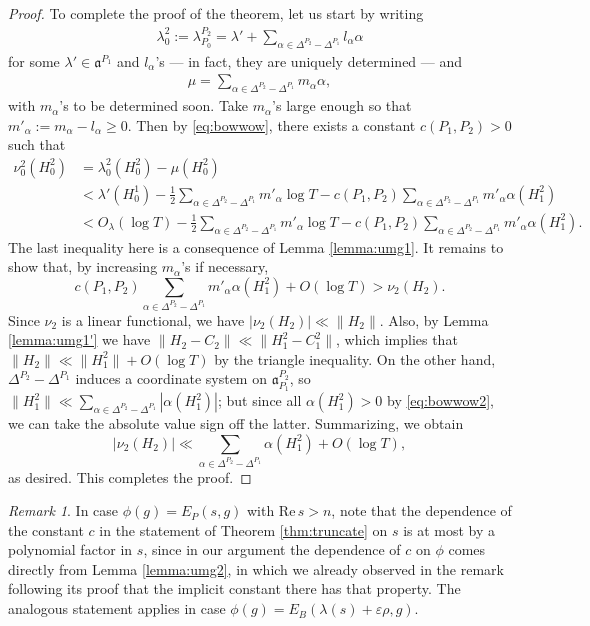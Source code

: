 \documentclass[11pt]{amsart}
\numberwithin{theorem}{section}
\numberwithin{equation}{section}
\theoremstyle{remark}
\newtheorem*{remark}{Remark}
\theoremstyle{definition}
\newcommand{\re}{\mathrm{Re}\,}
\newcommand{\ga}{\mathfrak{a}}
\begin{document}
\begin{proof}
To complete the proof of the theorem, let us start by writing
\begin{align*}
\lambda_0^2 := \lambda_{P_0}^{P_2} = \lambda' + \sum_{\alpha \in \Delta^{P_2} - \Delta^{P_1}} l_\alpha \alpha
\end{align*}
for some $\lambda' \in \ga^{P_1}$ and $l_\alpha$'s --- in fact, they are uniquely determined --- and
\begin{align*}
\mu = \sum_{\alpha \in \Delta^{P_2}-\Delta^{P_1}} m_\alpha \alpha,
\end{align*}
with $m_\alpha$'s to be determined soon. Take $m_\alpha$'s large enough so that $m'_\alpha := m_\alpha - l_\alpha \geq 0$.
Then by \eqref{eq:bowwow}, there exists a constant $c(P_1,P_2)>0$ such that
\begin{align*}
\nu_0^2(H_0^2) &= \lambda_0^2(H_0^2) - \mu(H_0^2) \\
&< \lambda'(H_0^1) -\frac{1}{2}\sum_{\alpha \in \Delta^{P_2} - \Delta^{P_1}} m'_\alpha\log T - c(P_1,P_2)\sum_{\alpha \in \Delta^{P_2} - \Delta^{P_1}} m'_\alpha\alpha(H_1^2) \\
&< O_\lambda(\log T) -\frac{1}{2}\sum_{\alpha \in \Delta^{P_2} - \Delta^{P_1}} m'_\alpha\log T - c(P_1,P_2)\sum_{\alpha \in \Delta^{P_2} - \Delta^{P_1}} m'_\alpha\alpha(H_1^2).
\end{align*}
The last inequality here is a consequence of Lemma \ref{lemma:umg1}.
It remains to show that, by increasing $m_\alpha$'s if necessary, 
\begin{equation*}
c(P_1,P_2)\sum_{\alpha \in \Delta^{P_2} - \Delta^{P_1}} m'_\alpha\alpha(H_1^2) + O(\log T) > \nu_2(H_2).
\end{equation*}
Since $\nu_2$ is a linear functional, we have $|\nu_2(H_2)| \ll \|H_2\|$. Also, by Lemma \ref{lemma:umg1'} we have $\|H_2-C_2\| \ll \|H_1^2-C_1^2\|$, which implies that $\|H_2\| \ll \|H_1^2\|+O(\log T)$ by the triangle inequality.
On the other hand, $\Delta^{P_2} - \Delta^{P_1}$ induces a coordinate system on $\ga_{P_1}^{P_2}$, so $\|H_1^2\| \ll \sum_{\alpha \in \Delta^{P_2} - \Delta^{P_1}} |\alpha(H_1^2)|$; but since all $\alpha(H_1^2) > 0$ by \eqref{eq:bowwow2}, we can take the absolute value sign off the latter. Summarizing, we obtain
\begin{equation*}
|\nu_2(H_2)| \ll \sum_{\alpha \in \Delta^{P_2} - \Delta^{P_1}} \alpha(H_1^2) + O(\log T),
\end{equation*}
as desired.
This completes the proof.
\end{proof}

\begin{remark}
In case $\phi(g) = E_P(s,g)$ with $\re s > n$, note that the dependence of the constant $c$ in the statement of Theorem \ref{thm:truncate} on $s$ is at most by a polynomial factor in $s$, since in our argument the dependence of $c$ on $\phi$ comes directly from Lemma \ref{lemma:umg2}, in which we already observed in the remark following its proof that the implicit constant there has that property. The analogous statement applies in case $\phi(g) = E_B(\lambda(s)+\varepsilon\rho,g)$.
\end{remark}
\end{document}

